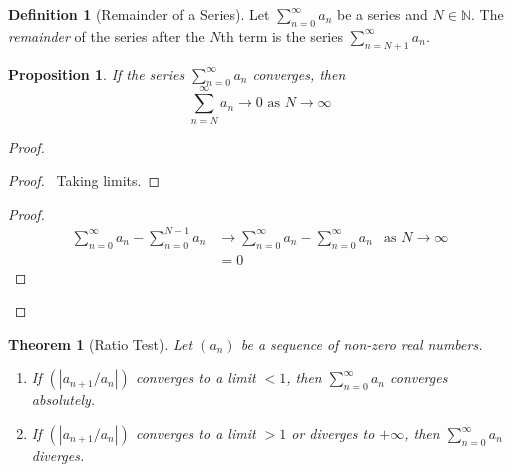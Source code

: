 \documentclass{article}
\let\qed\relax
\newtheorem{proposition}[axiom]{Proposition}
\newtheorem{theorem}[axiom]{Theorem}
\theoremstyle{definition}
\newtheorem{definition}[axiom]{Definition}
\begin{document}
\begin{definition}[Remainder of a Series]
    Let $\sum_{n=0}^\infty a_n$ be a series and $N \in \mathbb{N}$. The \emph{remainder} of the series after the $N$th term
    is the series $\sum_{n=N+1}^\infty a_n$.
\end{definition}

\begin{proposition}
    If the series $\sum_{n=0}^\infty a_n$ converges, then
    \[ \sum_{n=N}^\infty a_n \rightarrow 0 \text{ as } N \rightarrow \infty \]
\end{proposition}

\begin{proof}
    \pf
    \begin{proof}
        \pf\ Taking limits.
    \end{proof}
    \begin{proof}
        \pf
        \begin{align*}
            \sum_{n=0}^\infty a_n - \sum_{n=0}^{N-1} a_n & \rightarrow \sum_{n=0}^\infty a_n - \sum_{n=0}^\infty a_n & \text{as } N \rightarrow \infty \\
            & = 0
        \end{align*}
    \end{proof}
    \qed
\end{proof}

\begin{theorem}[Ratio Test]
    Let $(a_n)$ be a sequence of non-zero real numbers.
    \begin{enumerate}
        \item If $(|a_{n+1}/a_n|)$ converges to a limit $< 1$, then $\sum_{n=0}^\infty a_n$ converges absolutely.
        \item If $(|a_{n+1}/a_n|)$ converges to a limit $> 1$ or diverges to $+\infty$, then $\sum_{n=0}^\infty a_n$ diverges.
    \end{enumerate}
\end{theorem}
\end{document}
